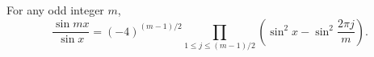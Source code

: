 For any odd integer $m$,
$$\frac{\sin mx}{\sin x} = (-4)^{(m-1)/2} \prod_{1 \leq j \leq (m-1)/2} \left( \sin^2 x - \sin^2 \frac{2\pi j}{m} \right).$$
